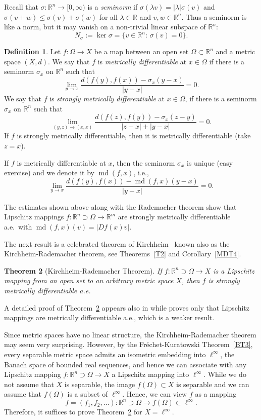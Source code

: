 \documentclass[12pt,leqno]{amsart}
\newtheorem{theorem}{Theorem}
\theoremstyle{definition}
\newtheorem{definition}[theorem]{Definition}
\newcommand{\bbbr}{\mathbb R}
\def\md{\operatorname{md}}
\numberwithin{theorem}{section} \numberwithin{equation}{section}
\begin{document}
Recall that $\sigma\colon \bbbr^n\to [0,\infty)$ is a {\em seminorm} if
$\sigma(\lambda v)=|\lambda|\sigma(v)$ and $\sigma(v+w)\leq\sigma(v)+\sigma(w)$ for all $\lambda\in\bbbr$ and $v,w\in\bbbr^n$. Thus a seminorm is like a norm, but it may vanish on a non-trivial linear subspace of $\bbbr^n$:
\begin{equation}
\label{INeq6}
N_\sigma:=\ker \sigma=\{v\in \bbbr^n:\, \sigma(v)=0\}.
\end{equation}
\begin{definition}
\label{def101}
Let $f:\Omega\to X$ be a map between an open set $\Omega\subset\bbbr^n$ and a metric space $(X,d)$. We say that $f$ is {\em metrically differentiable} at $x\in\Omega$ if there is a seminorm $\sigma_x$ on $\bbbr^n$ such that
$$
\lim_{y\to x} \frac{d(f(y),f(x))-\sigma_x(y-x)}{|y-x|}=0.
$$
We say that $f$ is {\em strongly metrically differentiable} at $x\in\Omega$, if there is a seminorm $\sigma_x$ on $\bbbr^n$ such that
$$
\lim_{(y,z)\to (x,x)} \frac{d(f(z),f(y))-\sigma_x(z-y)}{|z-x|+|y-x|}=0.
$$
If $f$ is strongly metrically differentiable, then it is metrically differentiable (take $z=x$).

If $f$ is metrically differentiable at $x$, then the seminorm $\sigma_x$ is unique (easy exercise) and we denote it by
$\md (f,x)$, i.e.,
$$
\lim_{y\to x} \frac{d(f(y),f(x))-\md (f,x)(y-x)}{|y-x|}=0.
$$
\end{definition}
The estimates shown above along with the Rademacher theorem show that Lipschitz mappings $f:\bbbr^n\supset\Omega\to\bbbr^m$ are strongly metrically differentiable a.e.\ with $\md (f,x)(v)=|Df(x)v|$.

The next result is a celebrated theorem of Kirchheim~\cite[Theorem~2]{kir} known also as the Kirchheim-Rademacher theorem, see Theorems~\ref{T2} and Corollary~\ref{MDT4}.
\begin{theorem}[Kirchheim-Rademacher Theorem]
\label{INT1}
If $f:\bbbr^n\supset\Omega\to X$ is a Lipschitz mapping from an open set to an arbitrary metric space $X$, then $f$ is strongly metrically differentiable a.e.
\end{theorem}
A detailed proof of Theorem~\ref{INT1} appears also in \cite[Theorem~3.2]{reichel} while \cite[Theorem~3.2]{ambkir} proves only that Lipschitz mappings are metrically differentiable a.e., which is a weaker result.

Since metric spaces have no linear structure, the Kirchheim-Rademacher theorem may seem very surprising. However, by the Fr\'echet-Kuratowski Theorem~\ref{BT3}, every separable metric space admits an isometric embedding into $\ell^\infty$, the Banach space of bounded real sequences, and hence we can associate with any Lipschitz mapping $f:\bbbr^n\supset\Omega\to X$ a Lipschitz mapping into $\ell^\infty$. While we do not assume that $X$ is separable, the image $f(\Omega)\subset X$ is separable and we can assume that $f(\Omega)$ is a subset of $\ell^\infty$. Hence, we can view $f$ as a mapping
\begin{equation}
\label{INeq7}
f=(f_1,f_2,\ldots):\bbbr^n\supset\Omega\to f(\Omega)\subset\ell^\infty.
\end{equation}
Therefore, it suffices to prove Theorem~\ref{INT1} for $X=\ell^\infty$.
\end{document}
